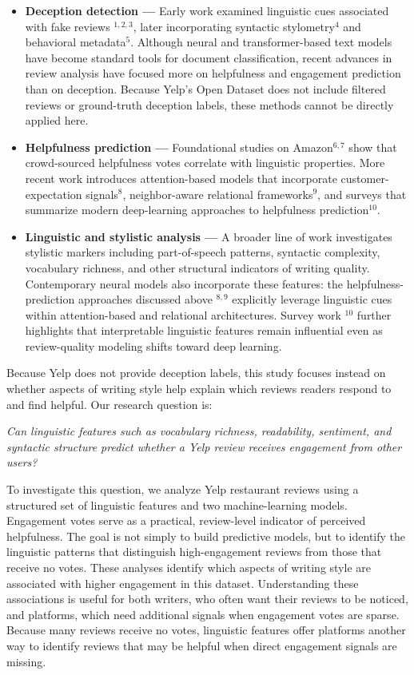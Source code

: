 \documentclass[12pt]{article}
\begin{document}
\begin{itemize}

\item \textbf{Deception detection —}  
Early work examined linguistic cues associated with fake reviews $^{1,2,3}$, later incorporating syntactic stylometry$^{4}$ and
 behavioral metadata$^{5}$. Although neural and transformer-based text models have become standard tools for document classification,
  recent advances in review analysis have focused more on helpfulness and engagement prediction than on deception. Because Yelp's 
  Open Dataset does not include filtered reviews or ground-truth deception labels, these methods cannot be directly applied here.

\item \textbf{Helpfulness prediction —}  
Foundational studies on Amazon$^{6, 7}$ show that crowd-sourced helpfulness votes correlate with linguistic properties.
 More recent work introduces attention-based models that incorporate customer-expectation signals$^{8}$, 
 neighbor-aware relational frameworks$^{9}$, 
and surveys that summarize modern deep-learning approaches to helpfulness prediction$^{10}$.

\item \textbf{Linguistic and stylistic analysis —}  
A broader line of work investigates stylistic markers including part-of-speech patterns, syntactic complexity, vocabulary richness, 
and other structural indicators of writing quality. 
Contemporary neural models also incorporate these features: the helpfulness-prediction approaches discussed above $^{8,9}$ explicitly leverage 
linguistic cues within attention-based and relational architectures. Survey work $^{10}$ further highlights that 
interpretable linguistic features remain influential even as review-quality modeling shifts toward deep learning.

\end{itemize}


Because Yelp does not provide deception labels, this study focuses instead on whether aspects of writing style help 
explain which reviews readers respond to and find helpful. Our research question is: 

\emph{Can linguistic features such as vocabulary richness, readability, sentiment, and syntactic structure predict whether a Yelp review receives engagement from other users?}

To investigate this question, we analyze Yelp restaurant reviews using a structured set of linguistic features and two machine-learning models.
 Engagement votes serve as a practical, review-level indicator of perceived helpfulness. The goal is not simply to build predictive models, 
 but to identify the linguistic patterns that distinguish high-engagement reviews from those that receive no votes. 
 These analyses identify which aspects of writing style are associated with higher engagement in this dataset. 
 Understanding these associations is useful for both writers, who often want their reviews to be noticed, and platforms, 
 which need additional signals when engagement votes are sparse. Because many reviews receive no votes, linguistic features offer platforms another way to identify reviews that may be helpful when direct engagement signals are missing.
\end{document}
